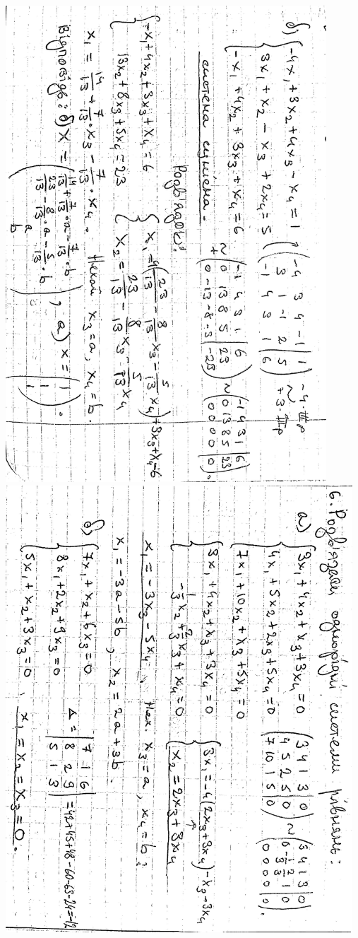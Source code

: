 \documentclass{article}
\begin{document}
\includegraphics[width=12cm,angle=90]{ons/8.jpg}\\
\includegraphics[width=13cm,angle=90]{ons/9.jpg}\\
\end{document}
